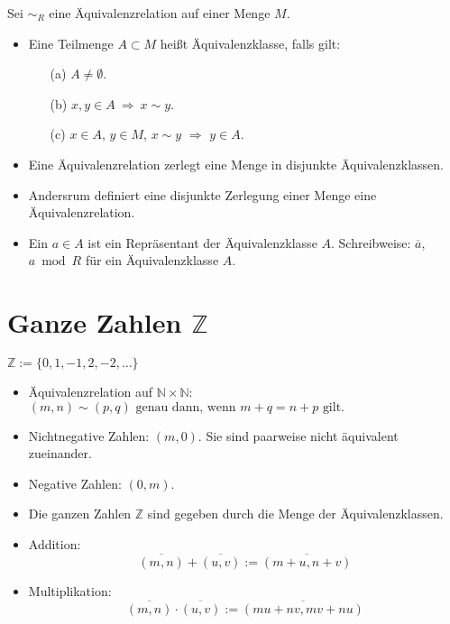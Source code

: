 \documentclass[a4paper,12pt,DIV15]{scrartcl}
\begin{document}
\begin{defn}[Äquivalenzklasse] Sei $\sim_R$ eine Äquivalenzrelation auf einer Menge $M$.
\begin{itemize}
\item Eine Teilmenge $A \subset M$ heißt {\color{red} Äquivalenzklasse}, falls gilt:
\begin{itemize}
\item [(a)] $A \neq \emptyset$.
\item [(b)] $x,y \in A \ \Rightarrow \ x \sim y$.
\item [(c)] $x \in A$, $y \in M$, $x \sim y$ $\Rightarrow$ $y \in A$.
\end{itemize}
\item Eine Äquivalenzrelation zerlegt eine Menge in disjunkte
Äquivalenzklassen.  
\item Andersrum definiert eine disjunkte Zerlegung einer Menge eine Äquivalenzrelation.
\item  Ein $a \in A$ ist ein {\color{red} Repräsentant} der Äquivalenzklasse
$A$. Schreibweise: $\overline{a}$, $a \bmod R$ für ein Äquivalenzklasse $A$. 
\end{itemize}
\end{defn}

\section{Ganze Zahlen $\mathbb{Z}$}
$\mathbb{Z}:=\{ 0,1,-1,2,-2,\dots \}$
\begin{itemize}
\item Äquivalenzrelation auf $\mathbb{N} \times \mathbb{N}$:\\
$(m,n) \sim (p,q) \mbox{ genau dann, wenn } m+q=n+p \mbox{ gilt.} $
\item Nichtnegative Zahlen: $(m,0)$. Sie sind paarweise nicht äquivalent
zueinander.
\item Negative Zahlen: $(0,m)$. 
\item Die ganzen Zahlen $\mathbb{Z}$ sind  gegeben durch die Menge
der Äquivalenzklassen.
\item Addition:
\[
\overline{(m,n)}+\overline{(u,v)}:=\overline{(m+u,n+v)}\]
\item Multiplikation:
\[
\overline{(m,n)}\cdot\overline{(u,v)}:=\overline{(m u+nv,mv+nu)}
\]
\end{itemize}
\end{document}
